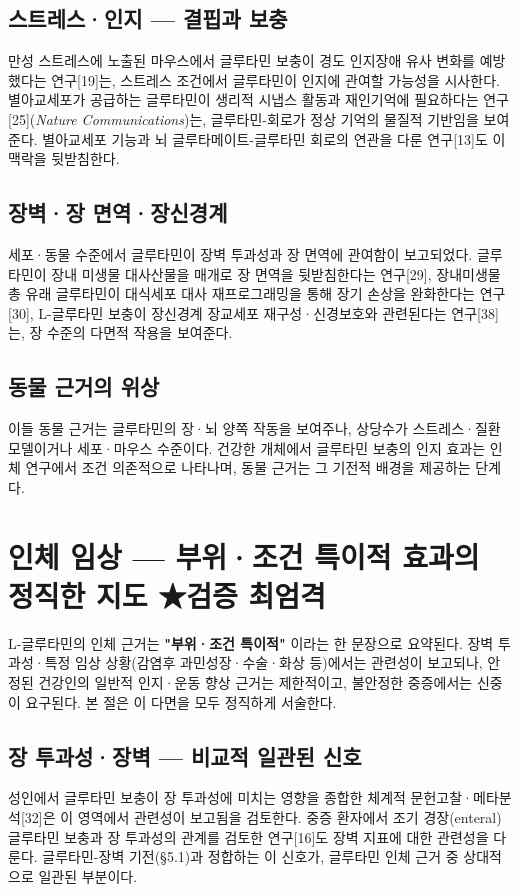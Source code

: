 \documentclass[11pt,oneside]{book}
\begin{document}
\subsection{스트레스·인지 — 결핍과 보충}
만성 스트레스에 노출된 마우스에서 글루타민 보충이 경도 인지장애 유사 변화를 예방했다는 연구[19]는, 스트레스 조건에서 글루타민이 인지에 관여할 가능성을 시사한다. 별아교세포가 공급하는 글루타민이 생리적 시냅스 활동과 재인기억에 필요하다는 연구[25](\textit{Nature Communications})는, 글루타민-회로가 정상 기억의 물질적 기반임을 보여준다. 별아교세포 기능과 뇌 글루타메이트-글루타민 회로의 연관을 다룬 연구[13]도 이 맥락을 뒷받침한다.

\subsection{장벽·장 면역·장신경계}
세포·동물 수준에서 글루타민이 장벽 투과성과 장 면역에 관여함이 보고되었다. 글루타민이 장내 미생물 대사산물을 매개로 장 면역을 뒷받침한다는 연구[29], 장내미생물총 유래 글루타민이 대식세포 대사 재프로그래밍을 통해 장기 손상을 완화한다는 연구[30], L-글루타민 보충이 장신경계 장교세포 재구성·신경보호와 관련된다는 연구[38]는, 장 수준의 다면적 작용을 보여준다.

\subsection{동물 근거의 위상}
이들 동물 근거는 글루타민의 장·뇌 양쪽 작동을 보여주나, 상당수가 스트레스·질환 모델이거나 세포·마우스 수준이다. 건강한 개체에서 글루타민 보충의 인지 효과는 인체 연구에서 조건 의존적으로 나타나며, 동물 근거는 그 기전적 배경을 제공하는 단계다.

\section{인체 임상 — 부위·조건 특이적 효과의 정직한 지도 ★검증 최엄격}
L-글루타민의 인체 근거는 \textbf{"부위·조건 특이적"} 이라는 한 문장으로 요약된다. 장벽 투과성·특정 임상 상황(감염후 과민성장·수술·화상 등)에서는 관련성이 보고되나, 안정된 건강인의 일반적 인지·운동 향상 근거는 제한적이고, 불안정한 중증에서는 신중이 요구된다. 본 절은 이 다면을 모두 정직하게 서술한다.

\subsection{장 투과성·장벽 — 비교적 일관된 신호}
성인에서 글루타민 보충이 장 투과성에 미치는 영향을 종합한 체계적 문헌고찰·메타분석[32]은 이 영역에서 관련성이 보고됨을 검토한다. 중증 환자에서 조기 경장(enteral) 글루타민 보충과 장 투과성의 관계를 검토한 연구[16]도 장벽 지표에 대한 관련성을 다룬다. 글루타민-장벽 기전(§5.1)과 정합하는 이 신호가, 글루타민 인체 근거 중 상대적으로 일관된 부분이다.
\end{document}
